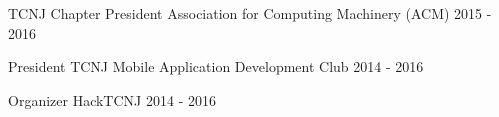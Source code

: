 
\begin{cvhonors}

  \cvhonor
    {TCNJ Chapter President} %
    {Association for Computing Machinery (ACM)} %
    {2015 - 2016} %

  \cvhonor
    {President} %
    {TCNJ Mobile Application Development Club} %
    {2014 - 2016} %

  \cvhonor
    {Organizer} %
    {HackTCNJ} %
    {2014 - 2016} %

\end{cvhonors}

